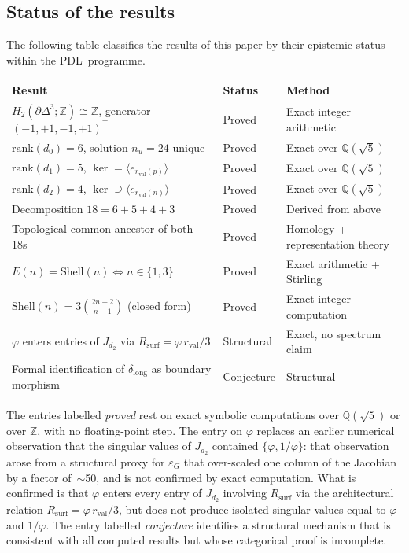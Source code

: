 \documentclass[11pt,a4paper]{article}
\theoremstyle{definition}
\newcommand{\PDL}{\textnormal{PDL}}
\newcommand{\Rsurf}{R_{\mathrm{surf}}}
\newcommand{\rval}{r_{\mathrm{val}}}
\newcommand{\epsg}{\varepsilon_G}
\newcommand{\rank}{\mathrm{rank}}
\newcommand{\dmap}[1]{d_{#1}}
\newcommand{\dlong}{\delta_{\mathrm{long}}}
\newcommand{\vp}{\varphi}
\newcommand{\Efun}{E}
\newcommand{\Shell}{\mathrm{Shell}}
\begin{document}
\subsection{Status of the results}
\label{subsec:status}

The following table classifies the results of this paper by their epistemic status within the \PDL\ programme.

\begin{center}
\begin{tabular}{lll}
\toprule
Result & Status & Method \\
\midrule
$H_2(\partial\Delta^3;\mathbb{Z}) \cong \mathbb{Z}$, generator $(-1,+1,-1,+1)^\top$ & Proved & Exact integer arithmetic \\
$\rank(\dmap{0}) = 6$, solution $n_u = 24$ unique & Proved & Exact over $\mathbb{Q}(\sqrt{5})$ \\
$\rank(\dmap{1}) = 5$, $\ker = \langle e_{\rval(p)}\rangle$ & Proved & Exact over $\mathbb{Q}(\sqrt{5})$ \\
$\rank(\dmap{2}) = 4$, $\ker \supseteq \langle e_{\rval(n)}\rangle$ & Proved & Exact over $\mathbb{Q}(\sqrt{5})$ \\
Decomposition $18 = 6+5+4+3$ & Proved & Derived from above \\
Topological common ancestor of both 18s & Proved & Homology + representation theory \\
$\Efun(n) = \Shell(n) \iff n \in \{1,3\}$ & Proved & Exact arithmetic + Stirling \\
$\Shell(n) = 3\binom{2n-2}{n-1}$ (closed form) & Proved & Exact integer computation \\
$\vp$ enters entries of $J_{\dmap{2}}$ via $\Rsurf = \vp\,\rval/3$ & Structural & Exact, no spectrum claim \\
Formal identification of $\dlong$ as boundary morphism & Conjecture & Structural \\
\bottomrule
\end{tabular}
\end{center}

\medskip\noindent The entries labelled \emph{proved} rest on exact symbolic computations over $\mathbb{Q}(\sqrt{5})$ or over $\mathbb{Z}$, with no floating-point step. The entry on $\vp$ replaces an earlier numerical observation that the singular values of $J_{\dmap{2}}$ contained $\{\vp, 1/\vp\}$: that observation arose from a structural proxy for $\epsg$ that over-scaled one column of the Jacobian by a factor of~$\sim$50, and is not confirmed by exact computation. What is confirmed is that $\vp$ enters every entry of $J_{\dmap{2}}$ involving $\Rsurf$ via the architectural relation $\Rsurf = \vp\,\rval/3$, but does not produce isolated singular values equal to $\vp$ and $1/\vp$. The entry labelled \emph{conjecture} identifies a structural mechanism that is consistent with all computed results but whose categorical proof is incomplete.
\end{document}
